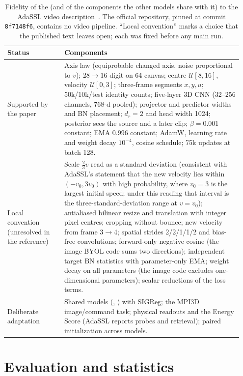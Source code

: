 \begin{table}[htbp]
\caption{Fidelity of the \emavar{} (and of the components the other models share with it) to the AdaSSL video description~\citep[App.~D.5]{zhang2026adassl}. The official repository, pinned at commit \texttt{8f7148f6}, contains no video pipeline. ``Local convention'' marks a choice that the published text leaves open; each was fixed before any main run.}
\label{tab:fidelity}
\centering
\scriptsize
\begin{tabular}{@{}p{0.23\linewidth}p{0.72\linewidth}@{}}
\toprule
Status & Components \\
\midrule
Supported by the paper & Axis law (equiprobable changed axis, noise proportional to $v$); 28$\to$16 digit on 64 canvas; centre $\mathcal U[8,16]$, velocity $\mathcal U[0,3]$; three-frame segments $x,y,u$; 50k/10k/test identity counts; five-layer 3D CNN (32--256 channels, 768-d pooled); projector and predictor widths and BN placement; $d_r=2$ and head width 1024; posterior sees the source and a later clip; $\beta=0.001$ constant; EMA 0.996 constant; AdamW, learning rate and weight decay $10^{-4}$, cosine schedule; 75k updates at batch 128. \\
\midrule
Local convention (unresolved in the reference) & Scale $\tfrac23v$ read as a standard deviation (consistent with AdaSSL's statement that the new velocity lies within $(-v_0,3v_0)$ with high probability, where $v_0=3$ is the largest initial speed; under this reading that interval is the three-standard-deviation range at $v=v_0$); antialiased bilinear resize and translation with integer pixel centres; cropping without bounce; new velocity from frame 3$\to$4; spatial strides 2/2/1/1/2 and bias-free convolutions; forward-only negative cosine (the image BYOL code sums two directions); independent target BN statistics with parameter-only EMA; weight decay on all parameters (the image code excludes one-dimensional parameters); scalar reductions of the loss terms. \\
\midrule
Deliberate adaptation & Shared models (\shdet{}, \shvar{}) with SIGReg; the MPI3D image/command task; physical readouts and the Energy Score (AdaSSL reports probes and retrieval); paired initialization across models. \\
\bottomrule
\end{tabular}
\end{table}

\FloatBarrier
\section{Evaluation and statistics}
\label{app:eval}

